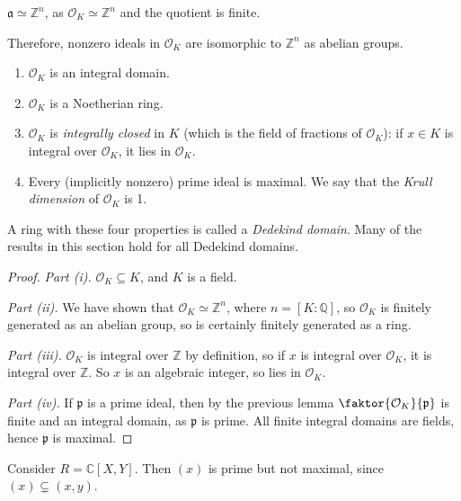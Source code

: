\begin{corollary}
    \( \mathfrak a \simeq \mathbb Z^n \), as \( \mathcal O_K \simeq \mathbb Z^n \) and the quotient is finite.
\end{corollary}
Therefore, nonzero ideals in \( \mathcal O_K \) are isomorphic to \( \mathbb Z^n \) as abelian groups.
\begin{proposition}
    \begin{enumerate}
        \item \( \mathcal O_K \) is an integral domain.
        \item \( \mathcal O_K \) is a Noetherian ring.
        \item \( \mathcal O_K \) is \emph{integrally closed} in \( K \) (which is the field of fractions of \( \mathcal O_K \)): if \( x \in K \) is integral over \( \mathcal O_K \), it lies in \( \mathcal O_K \).
        \item Every (implicitly nonzero) prime ideal is maximal.
        We say that the \emph{Krull dimension} of \( \mathcal O_K \) is 1.
    \end{enumerate}
\end{proposition}
\begin{remark}
    A ring with these four properties is called a \emph{Dedekind domain}.
    Many of the results in this section hold for all Dedekind domains.
\end{remark}
\begin{proof}
    \emph{Part (i).}
    \( \mathcal O_K \subseteq K \), and \( K \) is a field.

    \emph{Part (ii).}
    We have shown that \( \mathcal O_K \simeq \mathbb Z^n \), where \( n = [K : \mathbb Q] \), so \( \mathcal O_K \) is finitely generated as an abelian group, so is certainly finitely generated as a ring.

    \emph{Part (iii).}
    \( \mathcal O_K \) is integral over \( \mathbb Z \) by definition, so if \( x \) is integral over \( \mathcal O_K \), it is integral over \( \mathbb Z \).
    So \( x \) is an algebraic integer, so lies in \( \mathcal O_K \).

    \emph{Part (iv).}
    If \( \mathfrak p \) is a prime ideal, then by the previous lemma \( \faktor{\mathcal O_K}{\mathfrak p} \) is finite and an integral domain, as \( \mathfrak p \) is prime.
    All finite integral domains are fields, hence \( \mathfrak p \) is maximal.
\end{proof}
\begin{example}
    Consider \( R = \mathbb C[X,Y] \).
    Then \( (x) \) is prime but not maximal, since \( (x) \subsetneq (x,y) \).
\end{example}

